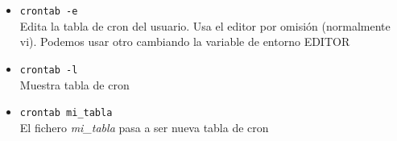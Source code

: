 \documentclass[ucs]{beamer}
\begin{document}
\begin{frame}[fragile]


\begin{itemize}
\item 
\verb|crontab -e|   \\Edita la tabla de cron del usuario. Usa el editor
por omisión (normalmente vi). Podemos usar otro cambiando la variable 
de entorno EDITOR
\item 
\verb|crontab -l|   \\Muestra tabla de cron
\item 
\verb|crontab mi_tabla|   \\El fichero \emph{mi\_tabla} pasa a ser nueva tabla de cron
\end{itemize}

\end{frame}

%
%
%
\end{document}
